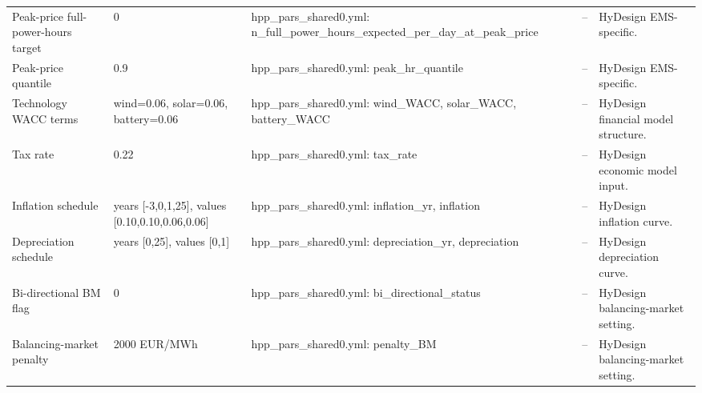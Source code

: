 \begin{center}
\begin{tabular}{L{0.16\textwidth} L{0.14\textwidth} L{0.22\textwidth} L{0.22\textwidth} L{0.20\textwidth}}
Peak-price full-power-hours target & 0 & hpp\_pars\_shared0.yml: n\_full\_power\_hours\_expected\_per\_day\_at\_peak\_price & -- & HyDesign EMS-specific. \\
Peak-price quantile & 0.9 & hpp\_pars\_shared0.yml: peak\_hr\_quantile & -- & HyDesign EMS-specific. \\
Technology WACC terms & wind=0.06, solar=0.06, battery=0.06 & hpp\_pars\_shared0.yml: wind\_WACC, solar\_WACC, battery\_WACC & -- & HyDesign financial model structure. \\
Tax rate & 0.22 & hpp\_pars\_shared0.yml: tax\_rate & -- & HyDesign economic model input. \\
Inflation schedule & years [-3,0,1,25], values [0.10,0.10,0.06,0.06] & hpp\_pars\_shared0.yml: inflation\_yr, inflation & -- & HyDesign inflation curve. \\
Depreciation schedule & years [0,25], values [0,1] & hpp\_pars\_shared0.yml: depreciation\_yr, depreciation & -- & HyDesign depreciation curve. \\
Bi-directional BM flag & 0 & hpp\_pars\_shared0.yml: bi\_directional\_status & -- & HyDesign balancing-market setting. \\
Balancing-market penalty & 2000 EUR/MWh & hpp\_pars\_shared0.yml: penalty\_BM & -- & HyDesign balancing-market setting. \\

\hline
\end{tabular}
\end{center}

\newpage

